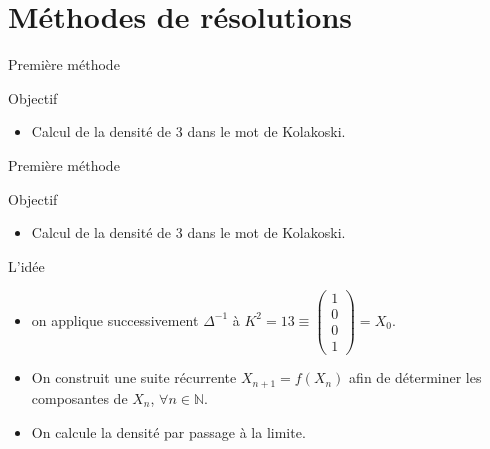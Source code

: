 \documentclass[12pt]{beamer}
\begin{document}
\section{Méthodes de résolutions}
\begin{frame}[t]{Première méthode}
  \begin{block}{Objectif}
    \begin{itemize}
\item Calcul de la densité de 3 dans le mot de Kolakoski. 
    \end{itemize}
  \end{block}
\end{frame}
\begin{frame}[t]{Première méthode}
  \begin{block}{Objectif}
    \begin{itemize}
    \item Calcul de la densité de 3 dans le mot de Kolakoski. 
    \end{itemize}
  \end{block}
  \begin{block}{L'idée}
    \begin{itemize}
    \item on applique successivement $\Delta^{-1}$ à $K^2=13 \equiv \left( \begin{array}{c}
1 \\ 
0 \\ 
0\\ 
1
\end{array} \right) =X_0$.
\item On construit une suite récurrente $X_{n+1}=f(X_n)$ afin de déterminer les composantes de $X_n$, $\forall n \in \mathbb{N}$.
\item On calcule la densité par passage à la limite.
   \end{itemize}
  \end{block}
\end{frame}
\end{document}

